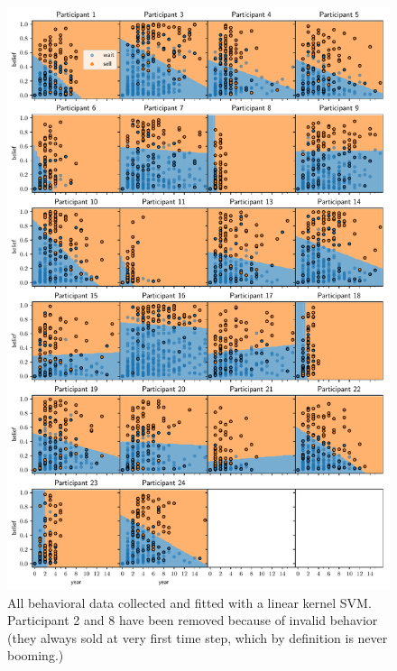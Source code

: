 \documentclass{article}
\begin{document}
\begin{figure}[H]
    \centering
    \includegraphics[width=.75\linewidth]{img/all_peeps.pdf}
    \caption{All behavioral data collected and fitted with a linear kernel SVM. Participant 2 and 8 have been removed because of invalid behavior (they always sold at very first time step, which by definition is never booming.)}
    \label{fig:all_beh}
\end{figure}
\end{document}
